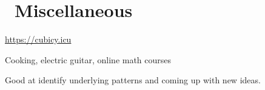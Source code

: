 \documentclass{resume}
\begin{document}

\section{\faInfo\ Miscellaneous}
\begin{description}[itemsep=0.5ex]
  \item[Personal Blog] \url{https://cubicy.icu}
  \item[Hobbies] Cooking, electric guitar, online math courses
  \item[self description] Good at identify underlying patterns and coming up with new ideas.
\end{description}
\end{document}
